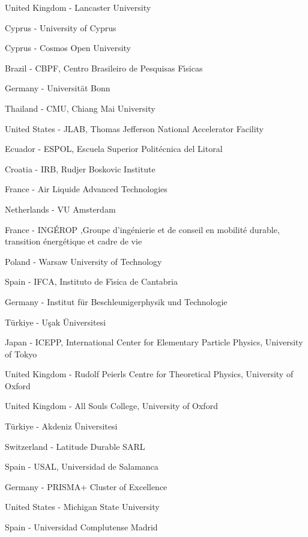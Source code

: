 \item[$^{363}$] United Kingdom - Lancaster University
\item[$^{364}$] Cyprus - University of Cyprus
\item[$^{365}$] Cyprus - Cosmos Open University
\item[$^{366}$] Brazil - CBPF, Centro Brasileiro de Pesquisas F{\'\i}sicas
\item[$^{367}$] Germany - Universit{\"a}t Bonn
\item[$^{368}$] Thailand - CMU, Chiang Mai University
\item[$^{369}$] United States - JLAB, Thomas Jefferson National Accelerator Facility
\item[$^{370}$] Ecuador - ESPOL, Escuela Superior Polit{\'e}cnica del Litoral
\item[$^{371}$] Croatia - IRB, Rudjer Boskovic Institute
\item[$^{372}$] France - Air Liquide Advanced Technologies
\item[$^{373}$] Netherlands - VU Amsterdam
\item[$^{374}$] France - ING{\'E}ROP ,Groupe d'ing{\'e}nierie et de conseil en mobilit{\'e} durable, transition {\'e}nerg{\'e}tique et cadre de vie
\item[$^{375}$] Poland - Warsaw University of Technology
\item[$^{376}$] Spain - IFCA, Instituto de F{\'\i}sica de Cantabria
\item[$^{377}$] Germany - Institut f{\"u}r Beschleunigerphysik und Technologie
\item[$^{378}$] T{\"u}rkiye - U{\c s}ak {\"U}niversitesi
\item[$^{379}$] Japan - ICEPP, International Center for Elementary Particle Physics, University of Tokyo
\item[$^{380}$] United Kingdom - Rudolf Peierls Centre for Theoretical Physics, University of Oxford
\item[$^{381}$] United Kingdom - All Souls College, University of Oxford
\item[$^{382}$] T{\"u}rkiye - Akdeniz {\"U}niversitesi
\item[$^{383}$] Switzerland - Latitude Durable SARL
\item[$^{384}$] Spain - USAL, Universidad de Salamanca
\item[$^{385}$] Germany - {PRISMA+} Cluster of Excellence
\item[$^{386}$] United States - Michigan State University
\item[$^{387}$] Spain - Universidad Complutense Madrid
